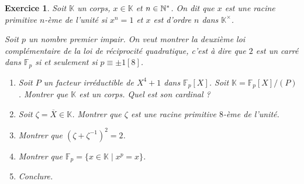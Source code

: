 \documentclass[11pt,a4paper]{article}
\newtheorem{ex}{Exercice}
\newcommand{\F}{\mathbb{F}}
\begin{document}
\begin{ex}
Soit $\mathbb{K}$ un corps, $x\in \mathbb{K}$ et $n\in \mathbb{N}^*$. On dit que $x$ est une racine primitive $n$-ème de l'unité si $x^n=1$ et $x$ est d'ordre $n$ dans $\mathbb{K}^\times$.

 Soit $p$ un nombre premier impair. On veut montrer la deuxième loi complémentaire de la loi de réciprocité quadratique, c'est à dire  que $2$ est un carré dans $\F_p$ si et seulement si $p\equiv \pm 1 [8]$.

\begin{enumerate}





                                                                                                                                   \item Soit $P$ un facteur irréductible de $X^4+1$ dans $\F_p[X]$. Soit $\mathbb{K}=\F_p[X]/(P)$. Montrer que $\mathbb{K}$ est un corps. Quel est son cardinal ?

                                                                                                                                   \item Soit $\zeta=\overline{X}\in \mathbb{K}$. Montrer que $\zeta$ est une racine primitive $8$-ème de l'unité.

                                                                                                                                   \item Montrer que $(\zeta+\zeta^{-1})^2 =2$.

                                                                                                                                   \item Montrer que $\F_p=\{x\in \mathbb{K}\mid x^p=x\}$.


                                                                                                                                   \item Conclure.

                                                                                                                                \end{enumerate}
\end{ex}
\end{document}
